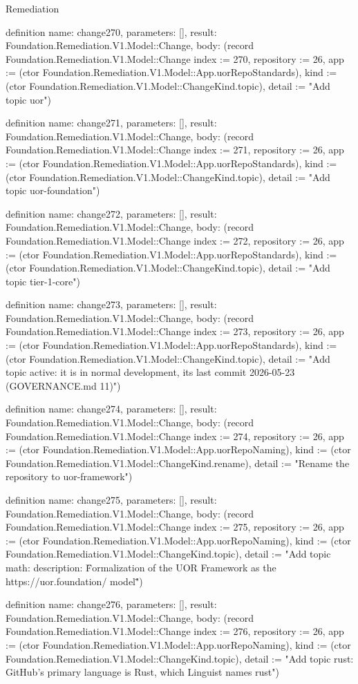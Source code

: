 \begin{lexlean}{Remediation}
\begin{semanticmodule}
definition{
  name: change270,
  parameters: [],
  result: Foundation.Remediation.V1.Model::Change,
  body: (record Foundation.Remediation.V1.Model::Change {index := 270, repository := 26, app := (ctor Foundation.Remediation.V1.Model::App.uorRepoStandards), kind := (ctor Foundation.Remediation.V1.Model::ChangeKind.topic), detail := "Add topic uor"})
}

definition{
  name: change271,
  parameters: [],
  result: Foundation.Remediation.V1.Model::Change,
  body: (record Foundation.Remediation.V1.Model::Change {index := 271, repository := 26, app := (ctor Foundation.Remediation.V1.Model::App.uorRepoStandards), kind := (ctor Foundation.Remediation.V1.Model::ChangeKind.topic), detail := "Add topic uor-foundation"})
}

definition{
  name: change272,
  parameters: [],
  result: Foundation.Remediation.V1.Model::Change,
  body: (record Foundation.Remediation.V1.Model::Change {index := 272, repository := 26, app := (ctor Foundation.Remediation.V1.Model::App.uorRepoStandards), kind := (ctor Foundation.Remediation.V1.Model::ChangeKind.topic), detail := "Add topic tier-1-core"})
}

definition{
  name: change273,
  parameters: [],
  result: Foundation.Remediation.V1.Model::Change,
  body: (record Foundation.Remediation.V1.Model::Change {index := 273, repository := 26, app := (ctor Foundation.Remediation.V1.Model::App.uorRepoStandards), kind := (ctor Foundation.Remediation.V1.Model::ChangeKind.topic), detail := "Add topic active: it is in normal development, its last commit 2026-05-23 (GOVERNANCE.md 11)"})
}

definition{
  name: change274,
  parameters: [],
  result: Foundation.Remediation.V1.Model::Change,
  body: (record Foundation.Remediation.V1.Model::Change {index := 274, repository := 26, app := (ctor Foundation.Remediation.V1.Model::App.uorRepoNaming), kind := (ctor Foundation.Remediation.V1.Model::ChangeKind.rename), detail := "Rename the repository to uor-framework"})
}

definition{
  name: change275,
  parameters: [],
  result: Foundation.Remediation.V1.Model::Change,
  body: (record Foundation.Remediation.V1.Model::Change {index := 275, repository := 26, app := (ctor Foundation.Remediation.V1.Model::App.uorRepoNaming), kind := (ctor Foundation.Remediation.V1.Model::ChangeKind.topic), detail := "Add topic math: description: \"Formalization of the UOR Framework as the https://uor.foundation/ model\""})
}

definition{
  name: change276,
  parameters: [],
  result: Foundation.Remediation.V1.Model::Change,
  body: (record Foundation.Remediation.V1.Model::Change {index := 276, repository := 26, app := (ctor Foundation.Remediation.V1.Model::App.uorRepoNaming), kind := (ctor Foundation.Remediation.V1.Model::ChangeKind.topic), detail := "Add topic rust: GitHub's primary language is Rust, which Linguist names rust"})
}


\end{semanticmodule}
\end{lexlean}

